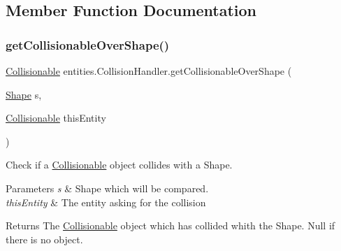 \subsection{Member Function Documentation}
\mbox{\label{classentities_1_1_collision_handler_a55c5a015e29edac05c725108e3d481f2}} 
\subsubsection{\texorpdfstring{get\+Collisionable\+Over\+Shape()}{getCollisionableOverShape()}}
{\footnotesize\ttfamily \mbox{\hyperlink{interfaceentities_1_1_collisionable}{Collisionable}} entities.\+Collision\+Handler.\+get\+Collisionable\+Over\+Shape (\begin{DoxyParamCaption}\item[{\mbox{\hyperlink{classorg_1_1newdawn_1_1slick_1_1geom_1_1_shape}{Shape}}}]{s,  }\item[{\mbox{\hyperlink{interfaceentities_1_1_collisionable}{Collisionable}}}]{this\+Entity }\end{DoxyParamCaption})\hspace{0.3cm}{\ttfamily [inline]}}

Check if a \mbox{\hyperlink{interfaceentities_1_1_collisionable}{Collisionable}} object collides with a Shape.


\begin{DoxyParams}{Parameters}
{\em s} & Shape which will be compared. \\
\hline
{\em this\+Entity} & The entity asking for the collision \\
\hline
\end{DoxyParams}
\begin{DoxyReturn}{Returns}
The \mbox{\hyperlink{interfaceentities_1_1_collisionable}{Collisionable}} object which has collided whith the Shape. Null if there is no object. 
\end{DoxyReturn}

